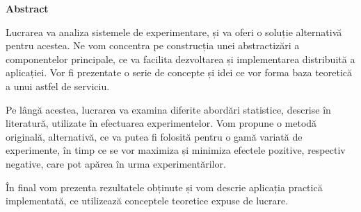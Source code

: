 \thispagestyle{plain}

\vspace*{\fill}

\begin{center}
	\Large \textbf{Abstract}	
\end{center}

Lucrarea va analiza sistemele de experimentare, și va oferi o soluție alternativă pentru acestea. Ne vom concentra pe construcția unei abstractizări a componentelor principale, ce va facilita dezvoltarea și implementarea distribuită a aplicației. Vor fi prezentate o serie de concepte și idei ce vor forma baza teoretică a unui astfel de serviciu.

Pe lângă acestea, lucrarea va examina diferite abordări statistice, descrise în literatură, utilizate în efectuarea experimentelor. Vom propune o metodă originală, alternativă, ce va putea fi folosită pentru o gamă variată de experimente, în timp ce se vor maximiza și minimiza efectele pozitive, respectiv negative, care pot apărea în urma experimentărilor.

În final vom prezenta rezultatele obținute și vom descrie aplicația practică implementată, ce utilizează conceptele teoretice expuse de lucrare.

\vspace*{\fill}
